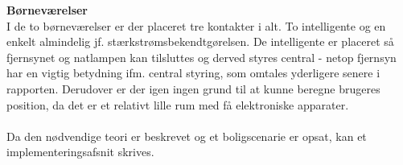 {\bf Børneværelser}\\
I de to børneværelser er der placeret tre kontakter i alt. To intelligente og en enkelt almindelig jf. stærkstrømsbekendtgørelsen. De intelligente er placeret så fjernsynet og natlampen kan tilsluttes og derved styres central - netop fjernsyn har en vigtig betydning ifm. central styring, som omtales yderligere senere i rapporten. Derudover er der igen ingen grund til at kunne beregne brugeres position, da det er et relativt lille rum med få elektroniske apparater.\\
\\
Da den nødvendige teori er beskrevet og et boligscenarie er opsat, kan et implementeringsafsnit skrives.
